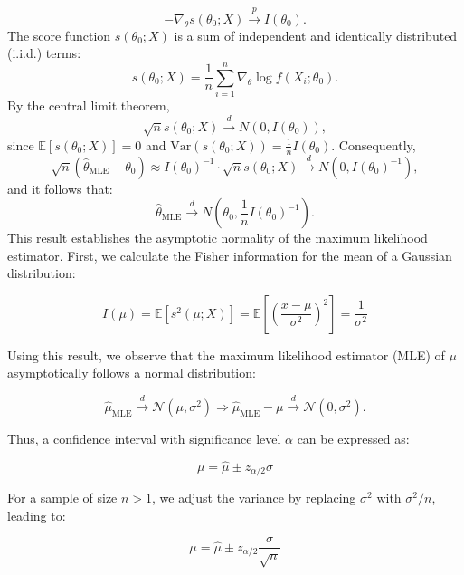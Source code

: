\documentclass{article}
\begin{document}
\begin{enumerate}
\begin{equation*}
    -\nabla_{\theta} s(\theta_0; X) \xrightarrow{p} I(\theta_0).
\end{equation*}
The score function $s(\theta_0; X)$ is a sum of independent and identically distributed (i.i.d.) terms:
\begin{equation*}
    s(\theta_0; X) = \frac{1}{n} \sum_{i=1}^{n} \nabla_{\theta} \log f(X_i; \theta_0).
\end{equation*}
By the central limit theorem,
\begin{equation*}
    \sqrt{n} s(\theta_0; X) \xrightarrow{d} N(0, I(\theta_0)),
\end{equation*}
since $\mathbb{E}[s(\theta_0; X)] = 0$ and $\text{Var}(s(\theta_0; X)) = \frac{1}{n} I(\theta_0)$. Consequently,
\begin{equation*}
    \sqrt{n} (\hat{\theta}_{\text{MLE}} - \theta_0) \approx I(\theta_0)^{-1} \cdot \sqrt{n} s(\theta_0; X) \xrightarrow{d} N \left(0, I(\theta_0)^{-1} \right),
\end{equation*}
and it follows that:
\begin{equation*}
    \hat{\theta}_{\text{MLE}} \xrightarrow{d} N \left( \theta_0, \frac{1}{n} I(\theta_0)^{-1} \right).
\end{equation*}
This result establishes the asymptotic normality of the maximum likelihood estimator.
First, we calculate the Fisher information for the mean of a Gaussian distribution:

\[
I(\mu) = \mathbb{E} \left[ s^2(\mu; X) \right] = \mathbb{E} \left[ \left( \frac{x - \mu}{\sigma^2} \right)^2 \right] = \frac{1}{\sigma^2}
\]

Using this result, we observe that the maximum likelihood estimator (MLE) of \(\mu\) asymptotically follows a normal distribution:

\[
\hat{\mu}_{\text{MLE}} \xrightarrow{d} \mathcal{N} (\mu, \sigma^2) \Rightarrow  \hat{\mu}_{\text{MLE}} - \mu \xrightarrow{d} \mathcal{N}(0, \sigma^2).
\]

Thus, a confidence interval with significance level \(\alpha\) can be expressed as:

\[
\mu = \hat{\mu} \pm z_{\alpha/2} \sigma
\]

For a sample of size \(n > 1\), we adjust the variance by replacing \(\sigma^2\) with \(\sigma^2/n\), leading to:

\[
\mu = \hat{\mu} \pm z_{\alpha/2} \frac{\sigma}{\sqrt{n}}
\]


\end{enumerate}
\end{document}
